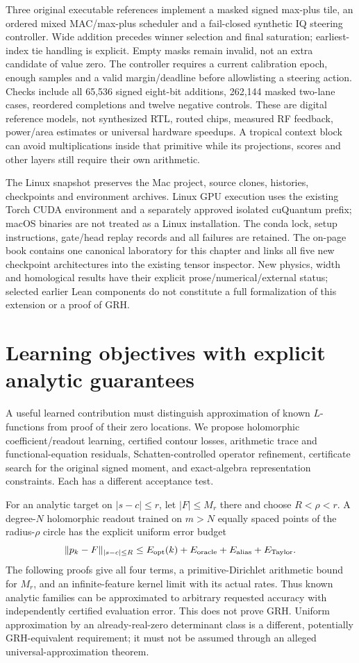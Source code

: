 \documentclass[11pt,oneside,openany]{book}
\theoremstyle{definition}\newtheorem{definition}[theorem]{Definition}
\theoremstyle{remark}\newtheorem{remark}[theorem]{Remark}
\begin{document}
Three original executable references implement a masked signed max-plus
tile, an ordered mixed MAC/max-plus scheduler and a fail-closed synthetic
IQ steering controller. Wide addition precedes winner selection and final
saturation; earliest-index tie handling is explicit. Empty masks remain
invalid, not an extra candidate of value zero. The controller requires a
current calibration epoch, enough samples and a valid margin/deadline before
allowlisting a steering action. Checks include all 65,536 signed eight-bit
additions, 262,144 masked two-lane cases, reordered completions and twelve
negative controls. These are digital reference models, not synthesized
RTL, routed chips, measured RF feedback, power/area estimates or universal
hardware speedups. A tropical context block can avoid multiplications
inside that primitive while its projections, scores and other layers still
require their own arithmetic.

The Linux snapshot preserves the Mac project, source clones, histories,
checkpoints and environment archives. Linux GPU execution uses the existing
Torch CUDA environment and a separately approved isolated cuQuantum prefix;
macOS binaries are not treated as a Linux installation. The conda lock,
setup instructions, gate/head replay records and all failures are retained.
The on-page book contains one canonical laboratory for this chapter and
links all five new checkpoint architectures into the existing tensor
inspector. New physics, width and homological results have their explicit
prose/numerical/external status; selected earlier Lean components do not
constitute a full formalization of this extension or a proof of GRH.


\section{Learning objectives with explicit analytic guarantees}
A useful learned contribution must distinguish approximation of known
$L$-functions from proof of their zero locations. We propose holomorphic
coefficient/readout learning, certified contour losses, arithmetic trace and
functional-equation residuals, Schatten-controlled operator refinement,
certificate search for the original signed moment, and exact-algebra
representation constraints. Each has a different acceptance test.

For an analytic target on $|s-c|\le r$, let $|F|\le M_r$ there and choose
$R<\rho<r$. A degree-$N$ holomorphic readout trained on $m>N$ equally spaced
points of the radius-$\rho$ circle has the explicit uniform error budget
\[
 \|p_k-F\|_{|s-c|\le R}
 \le E_{\rm opt}(k)+E_{\rm oracle}+E_{\rm alias}+E_{\rm Taylor}.
\]
The following proofs give all four terms, a primitive-Dirichlet arithmetic
bound for $M_r$, and an infinite-feature kernel limit with its actual rates.
Thus known analytic families can be approximated to arbitrary requested
accuracy with independently certified evaluation error. This does not prove
GRH. Uniform approximation by an already-real-zero determinant class is a
different, potentially GRH-equivalent requirement; it must not be assumed
through an alleged universal-approximation theorem.
\end{document}
